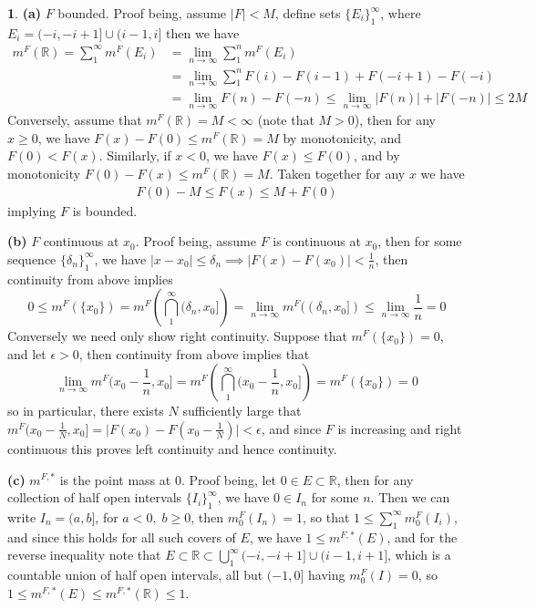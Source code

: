 \documentclass[10.5pt]{article}
\theoremstyle{definition}
\newtheorem{pb}{}
\newcommand{\set}[1]{\{#1\}}
\newcommand{\abs}[1]{\lvert#1\rvert}
\begin{document}
    \begin{pb}
        \textbf{(a)} \(F\) bounded. Proof being, assume \(\abs{F} < M\), define sets \(\set{E_i}_1^\infty\), where \(E_i = (-i,-i+1] \cup (i-1,i]\)
        then we have
        \begin{align*}
           m^F(\mathbb{R}) = \sum_1^\infty m^F(E_i) &= \lim_{n\to\infty}\sum_1^n m^F(E_i) \\
            &= \lim_{n\to\infty}\sum_1^n F(i) - F(i-1) + F(-i + 1) - F(-i) \\
            &= \lim_{n\to\infty}F(n) - F(-n) \leq \lim_{n\to\infty}\abs{F(n)} + \abs{F(-n)} \leq 2M
        \end{align*}
        Conversely, assume that \(m^F(\mathbb{R}) = M < \infty\) (note that \(M > 0\)), then for any \(x \geq 0\), we have \(F(x) - F(0) \leq m^F(\mathbb{R}) = M\) by monotonicity, and \(F(0) < F(x)\).
        Similarly, if \(x < 0\), we have \(F(x) \leq F(0)\), and by monotonicity \(F(0) - F(x) \leq m^F(\mathbb{R}) = M\). Taken together for any \(x\) we have
        \begin{align*}
            F(0) - M \leq F(x) \leq M + F(0)
        \end{align*}
        implying \(F\) is bounded. 

        \textbf{(b)} \(F\) continuous at \(x_0\). Proof being, assume \(F\) is continuous at \(x_0\), then for some sequence \(\set{\delta_n}_1^\infty\), we have 
        \(\abs{x - x_0} \leq \delta_n \implies \abs{F(x) - F(x_0)} < \frac{1}{n}\), then continuity from above implies 
        \[0 \leq m^F(\set{x_0}) = m^F\left(\bigcap_1^\infty(\delta_n,x_0]\right) = \lim_{n\to\infty}m^F((\delta_n,x_0]) \leq \lim_{n\to\infty}\frac{1}{n} = 0\]
        Conversely we need only show right continuity. Suppose that \(m^F(\set{x_0}) = 0\), and let \(\epsilon > 0\), then continuity from above implies that
        \[\lim_{n\to\infty}m^F(x_0 - \frac{1}{n},x_0] = m^F\left(\bigcap_1^\infty (x_0 - \frac{1}{n},x_0]\right) = m^F(\set{x_0}) = 0\]
        so in particular, there exists \(N\) sufficiently large that \(m^F(x_0 - \frac{1}{N},x_0] = \abs{F(x_0) - F(x_0 - \frac{1}{N})} < \epsilon\), 
        and since \(F\) is increasing and right continuous this proves left continuity and hence continuity.

        \textbf{(c)} \(m^{F,*}\) is the point mass at \(0\). Proof being, let \(0 \in E \subset \mathbb{R}\), then for any collection of half open intervals \(\set{I_i}_1^\infty\), we have 
        \(0 \in I_n\) for some \(n\). Then we can write \(I_n = (a,b]\), for \(a < 0, \; b \geq 0\), then \(m^F_0(I_n) = 1\), so that \(1 \leq \sum_1^\infty m^{F}_0(I_i)\), and since this holds for all such
        covers of \(E\), we have \(1 \leq m^{F,*}(E)\), and for the reverse inequality note that \(E \subset \mathbb{R} \subset \bigcup_1^\infty (-i, -i+1] \cup (i-1, i+1]\), which is a countable union of
        half open intervals, all but \((-1,0]\) having \(m^F_0(I) = 0\), so \(1 \leq m^{F,*}(E) \leq m^{F,*}(\mathbb{R}) \leq 1\).


\end{pb}
\end{document}

